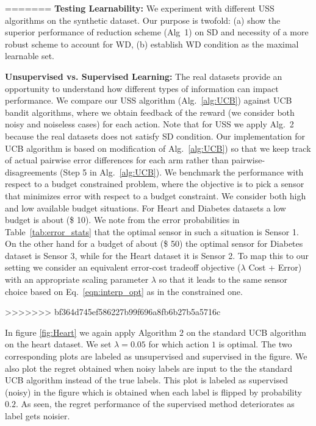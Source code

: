 =======
\noindent
{\bf Testing Learnability:}
We experiment with different USS algorithms on the synthetic dataset. Our purpose is twofold: (a) show the superior performance of reduction scheme (Alg~1) on SD and necessity of a more robust scheme to account for WD, (b) establish WD condition as the maximal learnable set.

\noindent
{\bf Unsupervised vs. Supervised Learning:}
The real datasets provide an opportunity to understand how different types of information can impact performance. We compare our USS algorithm (Alg.~\ref{alg:UCB}) against UCB bandit algorithms, where we obtain feedback of the reward (we consider both noisy and noiseless cases) for each action. Note that for USS we apply Alg.~2 because the real datasets does not satisfy SD condition. Our implementation for UCB algorithm is based on modification of Alg.~\ref{alg:UCB}) so that we keep track of actual pairwise error differences for each arm rather than pairwise-disagreements (Step 5 in Alg.~\ref{alg:UCB}). We benchmark the performance with respect to a budget constrained problem, where the objective is to pick a sensor that minimizes error with respect to a budget constraint. We consider both high and low available budget situations. For Heart and Diabetes datasets a low budget is about (\$ 10). We note from the error probabilities in Table~\ref{tab:error_stats} that the optimal sensor in such a situation is Sensor 1. On the other hand for a budget of about (\$ 50) the optimal sensor for Diabetes dataset is Sensor 3, while for the Heart dataset it is Sensor 2. To map this to our setting we consider an equivalent error-cost tradeoff objective ($\lambda$ Cost + Error) with an appropriate scaling parameter $\lambda$ so that it leads to the same sensor choice based on Eq.~\ref{eqn:interp_opt} as in the constrained one.


>>>>>>> bf364d745ef586227b99f696a8fb6b27b5a5716c

In figure \ref{fig:Heart} we again apply Algorithm $2$ on the standard UCB algorithm on the heart dataset. We set $\lambda=0.05$ for which action $1$ is optimal. The two corresponding plots are labeled as unsupervised and supervised in the figure. We also plot the regret obtained when noisy labels are input to the 
the standard UCB algorithm instead of the true labels. This plot is labeled as supervised (noisy) in the figure which is obtained when each label is flipped by probability $0.2$. As seen, the regret performance of the supervised method deteriorates as label gets noisier. 



